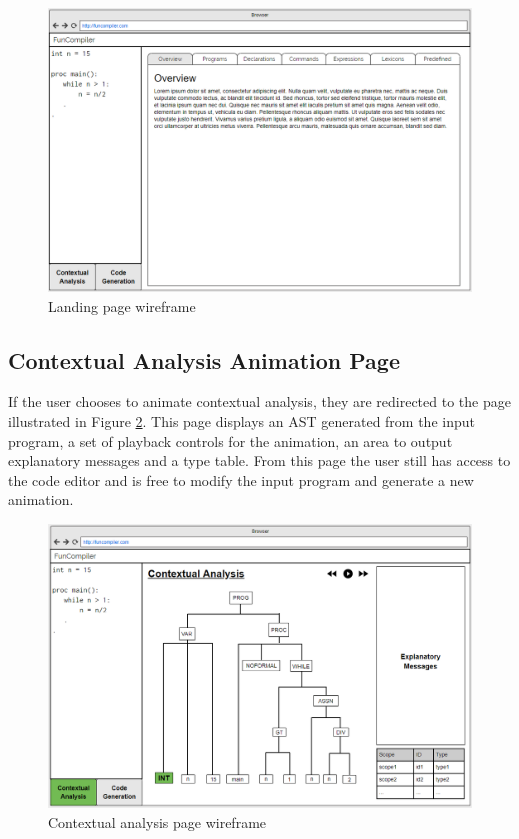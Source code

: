 \documentclass{l4proj}
\begin{document}
 \begin{figure}[h]
\centering
\includegraphics[scale=0.4]{images/full1.png}
\caption{Landing page wireframe}
\label{fig:full1}	
\end{figure}

\subsection{Contextual Analysis Animation Page}
If the user chooses to animate contextual analysis, they are redirected to the page illustrated in Figure \ref{fig:full2}. This page displays an AST generated from the input program, a set of playback controls for the animation, an area to output explanatory messages and a type table. From this page the user still has access to the code editor and is free to modify the input program and generate a new animation. 

 \begin{figure}[h]
\centering
\includegraphics[scale=0.4]{images/full2.png}
\caption{Contextual analysis page wireframe}
\label{fig:full2}	
\end{figure}
\pagebreak
\end{document}
